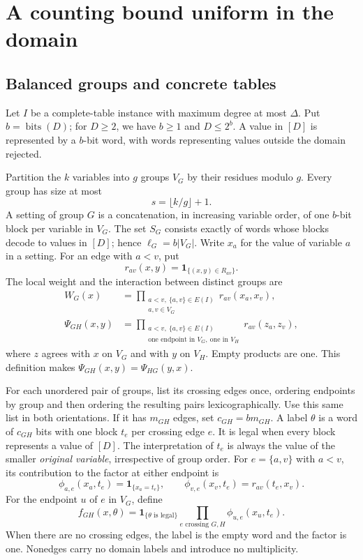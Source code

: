 \documentclass[11pt,reqno]{amsart}
\numberwithin{equation}{section}
\theoremstyle{definition}
\theoremstyle{remark}
\newcommand{\bits}{\operatorname{bits}}
\newcommand{\ind}[1]{\mathbf 1_{\{#1\}}}
\begin{document}
\section{A counting bound uniform in the domain}\label{sec:counting}

\subsection{Balanced groups and concrete tables}

Let $I$ be a complete-table instance with maximum degree at most $\Delta$. Put $b=\bits(D)$; for $D\ge2$, we have $b\ge1$ and $D\le2^b$. A value in $[D]$ is represented by a $b$-bit word, with words representing values outside the domain rejected.

Partition the $k$ variables into $g$ groups $V_G$ by their residues modulo $g$. Every group has size at most
\[
 s=\lfloor k/g\rfloor+1.
\]
A setting of group $G$ is a concatenation, in increasing variable order, of one $b$-bit block per variable in $V_G$. The set $S_G$ consists exactly of words whose blocks decode to values in $[D]$; hence $\ell_G=b|V_G|$. Write $x_a$ for the value of variable $a$ in a setting. For an edge with $a<v$, put
\[
 r_{av}(x,y)=\ind{(x,y)\in R_{av}}.
\]
The local weight and the interaction between distinct groups are
\begin{align}
 W_G(x)&=\prod_{\substack{a<v,\ \{a,v\}\in E(I)\\a,v\in V_G}}r_{av}(x_a,x_v),\label{eq:csp-local}\\
 \Psi_{GH}(x,y)&=\prod_{\substack{a<v,\ \{a,v\}\in E(I)\\
             \text{one endpoint in }V_G,\ \text{one in }V_H}}
                    r_{av}(z_a,z_v),\label{eq:csp-interaction}
\end{align}
where $z$ agrees with $x$ on $V_G$ and with $y$ on $V_H$. Empty products are one. This definition makes $\Psi_{GH}(x,y)=\Psi_{HG}(y,x)$.

For each unordered pair of groups, list its crossing edges once, ordering endpoints by group and then ordering the resulting pairs lexicographically. Use this same list in both orientations. If it has $m_{GH}$ edges, set $c_{GH}=b m_{GH}$. A label $\theta$ is a word of $c_{GH}$ bits with one block $t_e$ per crossing edge $e$. It is legal when every block represents a value of $[D]$. The interpretation of $t_e$ is always the value of the smaller \emph{original variable}, irrespective of group order. For $e=\{a,v\}$ with $a<v$, its contribution to the factor at either endpoint is
\begin{equation}\label{eq:csp-endpoint-factor}
 \phi_{a,e}(x_a,t_e)=\ind{x_a=t_e},\qquad
 \phi_{v,e}(x_v,t_e)=r_{av}(t_e,x_v).
\end{equation}
For the endpoint $u$ of $e$ in $V_G$, define
\begin{equation}\label{eq:csp-group-factor}
 f_{GH}(x,\theta)=\ind{\theta\text{ is legal}}
              \prod_{e\text{ crossing }G,H}\phi_{u,e}(x_u,t_e).
\end{equation}
When there are no crossing edges, the label is the empty word and the factor is one. Nonedges carry no domain labels and introduce no multiplicity.
\end{document}
